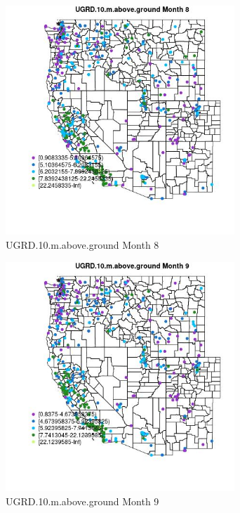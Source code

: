 \begin{figure} 
\centering  
\includegraphics[width=0.77\textwidth]{Code_Outputs/ML_input_report_ML_input_PM25_Step5_part_d_de_duplicated_aves_ML_input_MapObsMo8UGRD10maboveground.jpg} 
\caption{\label{fig:ML_input_report_ML_input_PM25_Step5_part_d_de_duplicated_aves_ML_inputMapObsMo8UGRD10maboveground}UGRD.10.m.above.ground Month 8} 
\end{figure} 
 

\begin{figure} 
\centering  
\includegraphics[width=0.77\textwidth]{Code_Outputs/ML_input_report_ML_input_PM25_Step5_part_d_de_duplicated_aves_ML_input_MapObsMo9UGRD10maboveground.jpg} 
\caption{\label{fig:ML_input_report_ML_input_PM25_Step5_part_d_de_duplicated_aves_ML_inputMapObsMo9UGRD10maboveground}UGRD.10.m.above.ground Month 9} 
\end{figure} 
 

